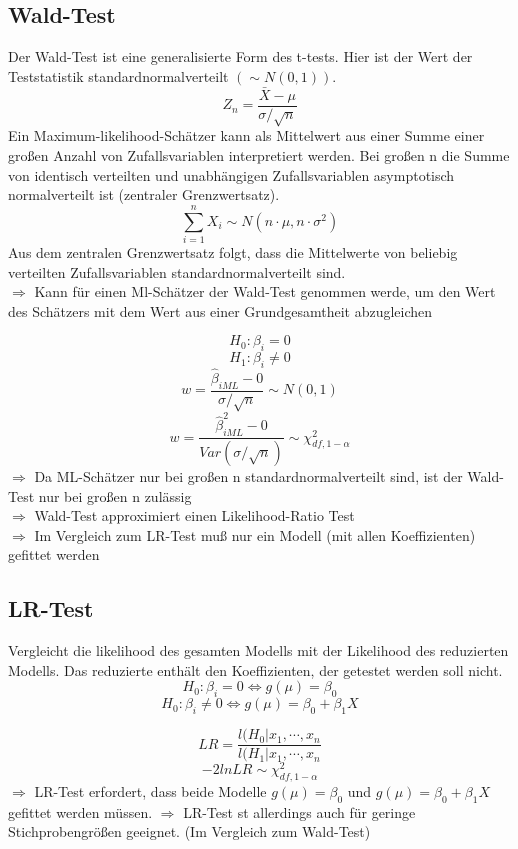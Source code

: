 \documentclass[10pt]{report}
\theoremstyle{definition}
\begin{document}
\subsection{Wald-Test}
Der Wald-Test ist eine generalisierte Form des t-tests. Hier ist der Wert der Teststatistik standardnormalverteilt $(\sim N(0,1))$.
\[Z_n = \frac{\bar{X} - \mu}{\sigma / \sqrt{n}} \]
Ein Maximum-likelihood-Schätzer kann als Mittelwert aus einer Summe einer großen Anzahl von Zufallsvariablen interpretiert werden.
Bei großen n die Summe von identisch verteilten und unabhängigen Zufallsvariablen asymptotisch normalverteilt ist (zentraler Grenzwertsatz).
\[\sum\limits_{i=1}^{n} X_i \sim N(n \cdot \mu, n \cdot \sigma^{2}) \]
Aus dem zentralen Grenzwertsatz folgt, dass die Mittelwerte von beliebig verteilten Zufallsvariablen standardnormalverteilt sind. \\
$\Rightarrow$ Kann für einen Ml-Schätzer der Wald-Test genommen werde, um den Wert des Schätzers mit dem Wert aus einer Grundgesamtheit abzugleichen

\[ H_0: \beta_i = 0 \]
\[ H_1: \beta_i \neq 0 \]
\[ w = \frac{\hat{\beta}_{iML}-0}{\sigma / \sqrt{n}} \sim N(0,1) \]
\[ w = \frac{\hat{\beta}_{iML}^{2}-0}{Var(\sigma / \sqrt{n})} \sim \chi_{df,1-\alpha}^{2} \]
$\Rightarrow$ Da ML-Schätzer nur bei großen n standardnormalverteilt sind, ist der Wald-Test nur bei großen n zulässig \\
$\Rightarrow$ Wald-Test approximiert einen Likelihood-Ratio Test \\
$\Rightarrow$ Im Vergleich zum LR-Test muß nur ein Modell (mit allen Koeffizienten) gefittet werden \\
\subsection{LR-Test}
Vergleicht die likelihood des gesamten Modells mit der Likelihood des reduzierten Modells. Das reduzierte enthält den Koeffizienten, der getestet werden soll nicht.
\[ H_0 : \beta_i = 0 \Leftrightarrow g(\mu) = \beta_0 \]
\[ H_0 : \beta_i \neq 0 \Leftrightarrow g(\mu) = \beta_0 + \beta_1 X \]

\[LR = \frac{l(H_0 | x_1,\cdots,x_n}{l(H_1 | x_1,\cdots,x_n}\]
\[ -2 ln LR \sim  \chi_{df,1-\alpha}^{2} \]
$\Rightarrow$ LR-Test erfordert, dass beide Modelle $g(\mu)=\beta_0$ und $g(\mu)=\beta_0 + \beta_1 X$ gefittet werden müssen.
$\Rightarrow$ LR-Test st allerdings auch für geringe Stichprobengrößen geeignet. (Im Vergleich zum Wald-Test)
\end{document}
